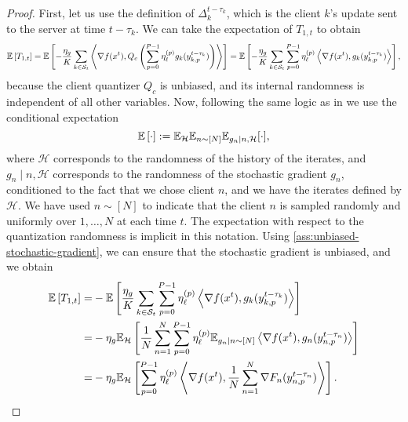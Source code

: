\begin{proof}
    First, let us use the definition of $\Delta_{k}^{t-\tau_k}$, which is the client $k$'s update sent to the server at time $t-\tau_k$. We can take the expectation of $T_{1,t}$ to obtain
    \begin{equation}
        \mathbb{E}\left[T_{1,t}\right]
        = \mathbb{E}\left[-\frac{\eta_g}{K} \sum_{k\in \mathcal{S}_t}  \left\langle \nabla f(x^t), Q_c \left( \sum_{p=0}^{P-1} \eta^{(p)}_{\ell} g_k(y^{t-\tau_k}_{k,p}) \right) \right\rangle\right]
        = \mathbb{E}\left[-\frac{\eta_g}{K} \sum_{k\in \mathcal{S}_t}  \sum_{p=0}^{P-1} \eta^{(p)}_{\ell} \left\langle \nabla f(x^t),   g_k(y^{t-\tau_k}_{k,p}) \right\rangle \right],
    \end{equation}
    because the client quantizer $Q_c$ is unbiased, and its internal randomness is independent of all other variables.
    Now, following the same logic as in \cite{FedBuff} we use the conditional expectation
    \begin{equation*}
        \mathbb{E}\left[\cdot\right]:= \mathbb{E}_{\mathcal{H}} \mathbb{E}_{n \sim [N]} \mathbb{E}_{g_n \mid n, \mathcal{H}}[\cdot],
    \end{equation*}
    where $\mathcal{H}$ corresponds to the randomness of the history of the iterates, and $g_n \mid n, \mathcal{H}$ corresponds to the randomness of the stochastic gradient $g_n$, conditioned to the fact that we chose client $n$, and we have the iterates defined by $\mathcal{H}$.
    We have used $n \sim [N]$ to indicate that the client $n$ is sampled randomly and uniformly over $1, \ldots, N$ at each time $t$.
    The expectation with respect to the quantization randomness is implicit in this notation.
    Using \cref{ass:unbiased-stochastic-gradient}, we can ensure that the stochastic gradient is unbiased, and we obtain
    \begin{equation}
        \begin{aligned}
            \expec{T_{1,t}} = & - \expec{ \frac{\eta_g}{K}  \sum_{k\in \calS_t} \sum_{p=0}^{P-1} \eta^{(p)}_{\ell}  \left\langle \nabla f(x^t),   g_k(y^{t-\tau_k}_{k,p}) \right\rangle }                                                              \\
            =                 & - \eta_g \mathbb{E}_{\mathcal{H}} \left[ \frac{1}{N} \sum_{n = 1}^N \sum_{p=0}^{P-1} \eta^{(p)}_{\ell}  \mathbb{E}_{g_n \mid n \sim[N]}  \left\langle \nabla f(x^t),    g_n(y^{t-\tau_n}_{n,p})  \right\rangle \right] \\
            =                 & - \eta_g \mathbb{E}_{\mathcal{H}} \left[ \sum_{p=0}^{P-1} \eta^{(p)}_{\ell} \left\langle \nabla f(x^t), \frac{1}{N} \sum_{n = 1}^N \nabla F_n(y^{t-\tau_n}_{n,p})  \right\rangle \right].

\end{aligned}
\end{equation}
\end{proof}
